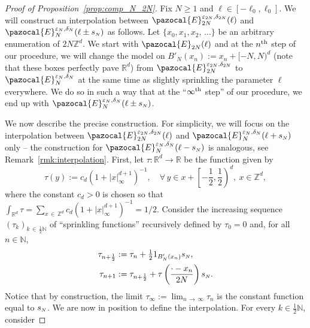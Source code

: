\documentclass[AHL,Unicode,longabstracts,published]{cedram}
\newcommand{\R}{\mathbb{R}}
\newcommand{\Z}{\mathbb{Z}}
\newcommand{\N}{\mathbb{N}}
\newcommand{\si}[1]{{\mathchoice{}{}{\scriptscriptstyle}{}#1}}
\newcommand{\sN}{{\mathchoice{}{}{\scriptscriptstyle}{}N}}
\let\oldforall\forall
\renewcommand*{\forall}{\mathrel{\oldforall}}
\newcommand{\R}{\mathbb{R}}
\newcommand{\Z}{\mathbb{Z}}
\begin{document}
\begin{proof}[Proof of Proposition~\ref{prop:comp_N_2N}] Fix $N\geq1$ and $\ell\in[-\ell_0,\ell_0]$. We will construct an interpolation between $\pazocal{E}_{2N}^{\varepsilon_{\si{2N}}, \delta_{\si{2N}}}(\ell)$ and $\pazocal{E}_{N}^{\varepsilon_{\sN}, \delta_{\sN}}(\ell\pm s_{\sN})$ as follows. Let $\{x_0,x_1,x_2,\,\dots\}$ be an arbitrary enumeration of $2N\Z^d$. We start with $\pazocal{E}_{2N}(\ell)$ and at the $n^{\rm th}$ step of our procedure, we will change the model on $B'_N(x_n):=x_n+[-N,N)^d$ (note that these boxes perfectly pave $\R^d$) from $\pazocal{E}_{2N}^{\varepsilon_{\si{2N}}, \delta_{\si{2N}}}$ to $\pazocal{E}^{\varepsilon_{\sN}, \delta_{\sN}}_{N}$ at the same time as slightly sprinkling the parameter $\ell$ everywhere. We do so in such a way that at the ``$\infty^{\rm th}$ step'' of our procedure, we end up with $\pazocal{E}^{\varepsilon_{\sN}, \delta_{\sN}}_{N}(\ell\pm s_{\sN})$.

We now describe the precise construction. For simplicity, we will focus on the interpolation between $\pazocal{E}_{2N}^{\varepsilon_{\si{2N}}, \delta_{\si{2N}}}(\ell)$ and $\pazocal{E}_{N}^{\varepsilon_{\sN}, \delta_{\sN}}(\ell+s_{\sN})$ only -- the construction for $\pazocal{E}_{N}^{\varepsilon_{\sN}, \delta_{\sN}}(\ell-s_{\sN})$ is analogous, see Remark~\ref{rmk:interpolation}. First, let $\tau:\R^d\to\R$ be the function given by
\begin{equation}\label{eq:tau}
\tau(y):=c_d\left(1+|x|_\infty^{d+1}\right)^{-1},\quad\forall\, y\in x+\left[-\frac12,\frac12\right)^d,~x\in \Z^d,
\end{equation}
where the constant $c_d>0$ is chosen so that $\int_{\R^d} \tau=\sum_{x\,\in\,\Z^d} c_d(1+|x|_\infty^{d+1})^{-1}=1/2$. Consider the increasing sequence $(\tau_k)_{k\,\in\,\frac12 \N}$ of ``sprinkling functions'' recursively defined by $\tau_0=0$ and, for all $n\in\N$,
\begin{align}
\tau_{n+\frac12} &:= \tau_n + \tfrac{1}{2} 1_{B'_{N}(x_n)} s_{\sN},\label{eq:tau_k_1}\\
\tau_{n+1} &:= \tau_{n+\frac12} + \tau\left(\frac{\cdot-x_n}{2N}\right)s_{\sN}.\label{eq:tau_k_2}
\end{align}
Notice that by construction, the limit $\tau_{\infty}:=\lim_{n\,\to\,\infty} \tau_n$ is the constant function equal to $s_{\sN}$. We are now in position to define the interpolation. For every $k\in\frac12\N$, consider


\end{proof}
\end{document}

